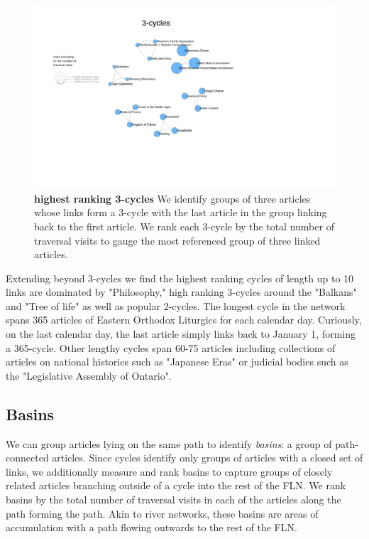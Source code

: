 \documentclass[pre,twocolumn,twoside,superscriptaddress,floatfix, aps, 10pt]{revtex4-1}
\begin{document}
\begin{figure}[tp!]
  \centering	
  \includegraphics[width=\textwidth]{graphics/3_cycles.pdf}
  \caption{
    \textbf{highest ranking 3-cycles}
    We identify groups of three articles whose links form a 3-cycle with the 
    last article in the group linking back to the first article.
    We rank each 3-cycle by the total number of traversal visits to gauge
    the most referenced group of three linked articles.
  }
  \label{fig:3-cycles}
\end{figure}

Extending beyond 3-cycles we find the highest ranking cycles of length 
up to 10 links are dominated by "Philosophy," high ranking 3-cycles
around the "Balkans" and "Tree of life" as well as popular 2-cycles.
The longest cycle in the network spans 365 articles of Eastern Orthodox Liturgics for each calendar day. 
Curiously, on the last calendar day, the last article simply links back to January 1, forming a 365-cycle.
Other lengthy cycles span 60-75 articles including collections of articles on national histories such as "Japanese Eras" 
or judicial bodies such as the "Legislative Assembly of Ontario".





\subsection{Basins}

We can group articles lying on the same path to identify {\it basins}: 
a group of path-connected articles.
Since cycles identify only groups of articles with a closed set of links, 
we additionally measure and rank basins to capture groups of closely related
articles branching outside of a cycle into the rest of the FLN.
We rank basins by the total number of traversal visits in each of the articles
along the path forming the path.
Akin to river networks, these basins are areas of accumulation with a path 
flowing outwards to the rest of the FLN.
\end{document}
